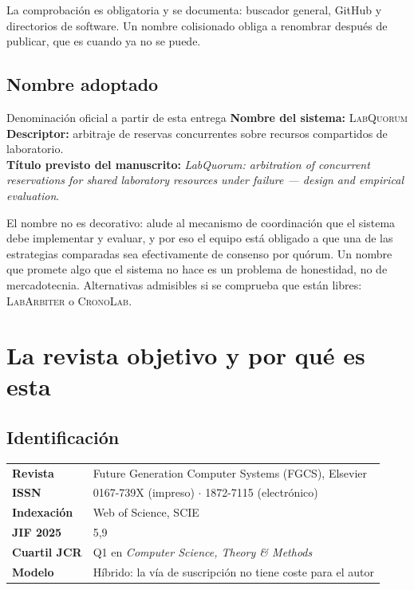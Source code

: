 \documentclass[11pt,a4paper]{article}
\begin{document}
La comprobación es obligatoria y se documenta: buscador general, GitHub y directorios de software. Un nombre colisionado obliga a renombrar después de publicar, que es cuando ya no se puede.

\subsection{Nombre adoptado}

\begin{aviso}{Denominación oficial a partir de esta entrega}
	\textbf{Nombre del sistema:} \textsc{LabQuorum}\\[6pt]
	\textbf{Descriptor:} arbitraje de reservas concurrentes sobre recursos compartidos de laboratorio.\\[6pt]
	\textbf{Título previsto del manuscrito:} \emph{LabQuorum: arbitration of concurrent reservations for shared laboratory resources under failure --- design and empirical evaluation}.
\end{aviso}

El nombre no es decorativo: alude al mecanismo de coordinación que el sistema debe implementar y evaluar, y por eso el equipo está obligado a que una de las estrategias comparadas sea efectivamente de consenso por quórum. Un nombre que promete algo que el sistema no hace es un problema de honestidad, no de mercadotecnia. Alternativas admisibles si se comprueba que están libres: \textsc{LabArbiter} o \textsc{CronoLab}.

\section{La revista objetivo y por qué es esta}

\subsection{Identificación}

\begin{center}
	\small
	\begin{tabular}{@{}p{4.4cm}p{10.6cm}@{}}
		\toprule
		\textbf{Revista} & Future Generation Computer Systems (FGCS), Elsevier \\
		\textbf{ISSN} & 0167-739X (impreso) $\cdot$ 1872-7115 (electrónico) \\
		\textbf{Indexación} & Web of Science, SCIE \\
		\textbf{JIF 2025} & 5,9 \\
		\textbf{Cuartil JCR} & Q1 en \emph{Computer Science, Theory \& Methods} \\
		\textbf{Modelo} & Híbrido: la vía de suscripción no tiene coste para el autor \\
		\bottomrule
	\end{tabular}
\end{center}
\end{document}
